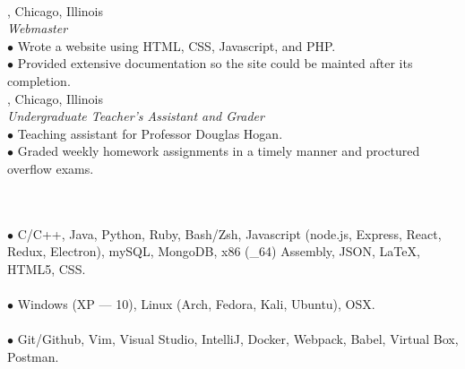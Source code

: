 \documentclass[11pt]{article}
\begin{document}
 \\
, Chicago, Illinois \\
\indent \textit{Webmaster} \\
\indent $\bullet$ Wrote a website using HTML, CSS, Javascript, and PHP.\@ \\
\indent $\bullet$ Provided extensive documentation so the site could be mainted after its completion. \\
, Chicago, Illinois \\
\indent \textit{Undergraduate Teacher's Assistant and Grader} \\
\indent $\bullet$ Teaching assistant for Professor Douglas Hogan. \\
\indent $\bullet$ Graded weekly homework assignments in a timely manner and proctured overflow exams.

 \\
 \\
\indent $\bullet$ C/C++, Java, Python, Ruby, Bash/Zsh, Javascript (node.js, Express, React, Redux, Electron), mySQL, MongoDB, x86 (\_64) Assembly, JSON, \LaTeX, HTML5, CSS.\@ \\
 \\
\indent $\bullet$ Windows (XP --- 10), Linux (Arch, Fedora, Kali, Ubuntu), OSX.\@ \\
 \\
\indent $\bullet$ Git/Github, Vim, Visual Studio, IntelliJ, Docker, Webpack, Babel, Virtual Box, Postman.

\end{document}
